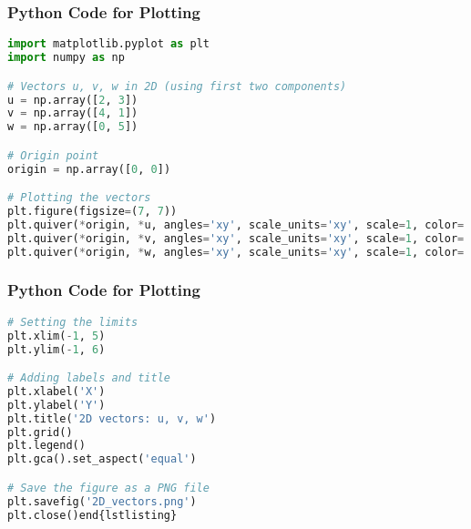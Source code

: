 \documentclass{beamer}
\numberwithin{equation}{section}
\begin{document}
\begin{frame}[fragile]
\frametitle{Python Code for Plotting}
\begin{lstlisting}[language=Python]
import matplotlib.pyplot as plt
import numpy as np

# Vectors u, v, w in 2D (using first two components)
u = np.array([2, 3])
v = np.array([4, 1])
w = np.array([0, 5])

# Origin point
origin = np.array([0, 0])

# Plotting the vectors
plt.figure(figsize=(7, 7))
plt.quiver(*origin, *u, angles='xy', scale_units='xy', scale=1, color='red', label='u = [2, 3]')
plt.quiver(*origin, *v, angles='xy', scale_units='xy', scale=1, color='green', label='v = [4, 1]')
plt.quiver(*origin, *w, angles='xy', scale_units='xy', scale=1, color='blue', label='w = [0, 5]')

\end{lstlisting}

\end{frame}
\begin{frame}[fragile]
\frametitle{Python Code for Plotting}
\begin{lstlisting}[language=Python]
# Setting the limits
plt.xlim(-1, 5)
plt.ylim(-1, 6)

# Adding labels and title
plt.xlabel('X')
plt.ylabel('Y')
plt.title('2D vectors: u, v, w')
plt.grid()
plt.legend()
plt.gca().set_aspect('equal')

# Save the figure as a PNG file
plt.savefig('2D_vectors.png')
plt.close()end{lstlisting}

\end{lstlisting}

\end{frame}
\end{document}
